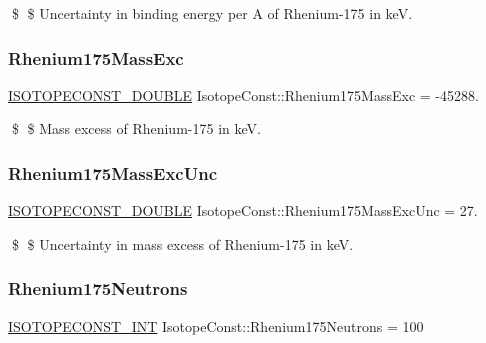 \$ \$ Uncertainty in binding energy per A of Rhenium-\/175 in keV. \mbox{\label{group___isotope_const-_rhenium-_re175_ga3545ff5ef4547ca857f5072473ed550e}} 
\subsubsection{\texorpdfstring{Rhenium175\+Mass\+Exc}{Rhenium175MassExc}}
{\footnotesize\ttfamily \mbox{\hyperlink{group___isotope_const-_macros_ga8f45a7272ce02c0b4c65c44636ed719a}{I\+S\+O\+T\+O\+P\+E\+C\+O\+N\+S\+T\+\_\+\+D\+O\+U\+B\+LE}} Isotope\+Const\+::\+Rhenium175\+Mass\+Exc = -\/45288.}

\$ \$ Mass excess of Rhenium-\/175 in keV. \mbox{\label{group___isotope_const-_rhenium-_re175_gae721726e4d34a167f693e2012cf052cf}} 
\subsubsection{\texorpdfstring{Rhenium175\+Mass\+Exc\+Unc}{Rhenium175MassExcUnc}}
{\footnotesize\ttfamily \mbox{\hyperlink{group___isotope_const-_macros_ga8f45a7272ce02c0b4c65c44636ed719a}{I\+S\+O\+T\+O\+P\+E\+C\+O\+N\+S\+T\+\_\+\+D\+O\+U\+B\+LE}} Isotope\+Const\+::\+Rhenium175\+Mass\+Exc\+Unc = 27.}

\$ \$ Uncertainty in mass excess of Rhenium-\/175 in keV. \mbox{\label{group___isotope_const-_rhenium-_re175_gac65909e80fe9fd475e62deb9941f454d}} 
\subsubsection{\texorpdfstring{Rhenium175\+Neutrons}{Rhenium175Neutrons}}
{\footnotesize\ttfamily \mbox{\hyperlink{group___isotope_const-_macros_ga5f18360b3e99483a35c32d789e62621c}{I\+S\+O\+T\+O\+P\+E\+C\+O\+N\+S\+T\+\_\+\+I\+NT}} Isotope\+Const\+::\+Rhenium175\+Neutrons = 100}

